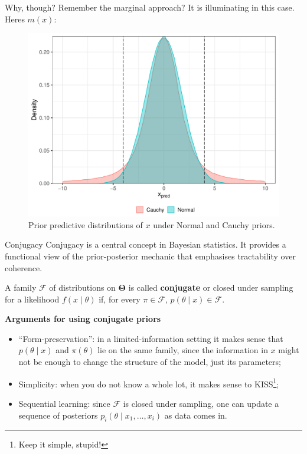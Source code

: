 \begin{frame}{Why, though?}
Remember the marginal approach?
It is illuminating in this case.
Heres $m(x)$:
\begin{figure}
\includegraphics[scale=0.5]{figures/BC_example_326.pdf}
 \caption{Prior predictive distributions of $x$ under Normal and Cauchy priors.}
\end{figure}
\end{frame}
\begin{frame}{Conjugacy}
Conjugacy is a central concept in Bayesian statistics. 
It provides a functional view of the prior-posterior mechanic that emphasises tractability over coherence.
\begin{defn}[Conjugate]
\label{def:conjugate}
A family $\mathcal{F}$ of distributions on $\boldsymbol{\Theta}$ is called \textbf{conjugate} or closed under sampling for a likelihood $f(x \mid \theta)$ if, for every $\pi \in \mathcal{F}$, $p(\theta \mid x) \in \mathcal{F}$.
\end{defn}
\textbf{Arguments for using conjugate priors}
\begin{itemize}
 \item ``Form-preservation'': in a limited-information setting it makes sense that $p(\theta \mid x)$ and $\pi(\theta)$ lie on the same family, since the information in $x$ might not be enough to change the structure of the model, just its parameters;
 \item Simplicity: when you do not know a whole lot, it makes sense to KISS\footnote{Keep it simple, stupid!};
 \item Sequential learning: since $\mathcal{F}$ is closed under sampling, one can update a sequence of posteriors $p_i(\theta \mid x_1, \ldots, x_i)$ as data comes in.
\end{itemize}
\end{frame}
